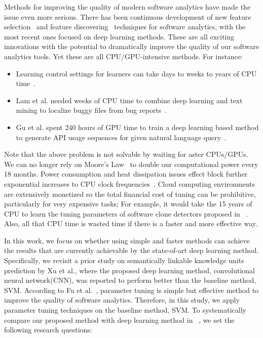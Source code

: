 \documentclass[sigconf,review, anonymous]{acmart}
\theoremstyle{break}
\newcommand{\bi}{\begin{itemize}[leftmargin=0.4cm]}
\newcommand{\ei}{\end{itemize}}
\begin{document}
Methods for improving the quality of modern software analytics have made the issue even more serious. There has been continuous development of new feature selection~\cite{hall2003benchmarking} and feature discovering~\cite{jiang2013personalized} techniques for software analytics, with the most recent ones focused on deep learning methods. These are all exciting innovations with the potential to dramatically improve the quality of our software analytics tools. Yet these are all CPU/GPU-intensive methods. For instance:
\bi
\item Learning control settings for learners can take days to weeks to years of CPU time~\cite{fu2016differential,tantithamthavorn2016automated,wang2013searching}.
\item Lam et al. needed weeks of CPU time to combine deep learning and text mining to localize buggy
files from bug reports~\cite{lam2015combining}.
\item Gu et al. spent $240$ hours of GPU time  to train a deep learning based method to generate API usage sequences for given natural language query~\cite{gu2016deep}. 
\ei 
Note that the above problem is not solvable by waiting for aster CPUs/GPUs. We 
can no longer rely on Moore's Law ~\cite{moore1998cramming}to double our computational power every 18 months. Power consumption and heat dissipation issues effect block further exponential increases to CPU clock frequencies~\cite{kumar2003single}. Cloud computing environments are extensively monetized so the total financial cost of tuning can be prohibitive, particularly for very expensive tasks; For example, it would take the 15 years of CPU to learn the tuning parameters of software clone detectors proposed in ~\cite{wang2013searching}. Also, all that CPU time is wasted time if there is a faster and more effective way.

In this work,  we focus on whether using simple and faster methods can achieve
the results that are currently achievable by the state-of-art deep learning method.
Specifically, we revisit a prior study on semantically linkable
knowledge units prediction by Xu et al.\cite{xu2016predicting}, where
the proposed deep learning method, convolutional neural network(CNN), was reported
to perform better than the baseline method, SVM.  According to Fu et al.~\cite{fu2016tuning}, parameter tuning is simple but effective method to improve the quality of software analytics. Therefore, in this study, we apply parameter
tuning techniques on the baseline method, SVM. To systematically compare
our proposed method with deep learning method in ~\cite{xu2016predicting}, we set the following research questions:
\end{document}
